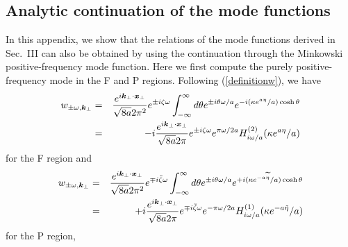 \documentclass[aps,prd,preprintnumbers,nofootinbib,showpacs,11pt]{revtex4}%
\begin{document}
\begin{widetext}
\section{Analytic continuation of the mode functions}
In this appendix, we show that the 
 relations of the mode functions derived in Sec.~III can also be obtained by using the continuation 
through the Minkowski positive-frequency mode function.  
Here we first compute the purely positive-frequency mode in the F and P regions. 
Following (\ref{definitionw}), 
we have 
\begin{eqnarray}
w_{\pm \omega,{\bm k}_\perp}&=&{e^{i{\bm k}_\perp\cdot{\bm x}_\perp}\over \sqrt{8a}2\pi^2} e^{\pm i\zeta\omega}
\int_{-\infty}^{\infty} d\theta e^{\pm i\theta\omega/a}
e^{-i(\kappa e^{a\eta}/a)\cosh\theta }
\nonumber\\
&=&-i{e^{i{\bm k}_\perp\cdot{\bm x}_\perp}\over \sqrt{8a}2\pi} e^{\pm i\zeta\omega}e^{\pi\omega/2a}
H_{i\omega/a}^{(2)}(\kappa e^{a\eta}/a)
\label{wF}
\end{eqnarray}
for the F region and 
\begin{eqnarray}
w_{\pm \omega,{\bm k}_\perp}&=&{e^{i{\bm k}_\perp\cdot{\bm x}_\perp}\over \sqrt{8a}2\pi^2} e^{\mp i\tilde\zeta\omega}
\int_{-\infty}^{\infty} d\theta e^{\pm i\theta\omega/a}
e^{+i (\kappa e^{-a\widetilde\eta}/a)\cosh\theta }
\nonumber\\
&=&+i{e^{i{\bm k}_\perp\cdot{\bm x}_\perp}\over \sqrt{8a}2\pi} e^{\mp i\tilde\zeta\omega}e^{-\pi\omega/2a}
H_{i\omega/a}^{(1)}(\kappa e^{-a\tilde\eta}/a)
\label{wP}
\end{eqnarray}
for the P region, 

\end{widetext}
\end{document}
